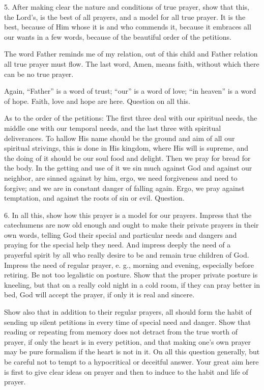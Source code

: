  5. After making clear the nature and conditions of true prayer, show that this, the Lord’s, is the best of all prayers, and a model for all true prayer. It is the best, because of Him whose it is and who
commends it, because it embraces all our wants in a few words, because of the beautiful order of the petitions.

 The word Father reminds me of my relation, out of this child and Father relation all true prayer must flow. The last word, Amen, means faith, without which there can be no true prayer.

Again, “Father” is a word of trust; “our” is a word of love; “in heaven” is a word of hope. Faith, love and hope are here. Question on all this.

 As to the order of the petitions: The first three deal with our spiritual needs, the middle one with our temporal needs, and the last three with spiritual deliverances. To hallow His name should be the ground and aim of all our spiritual strivings, this is done in His kingdom, where His will is supreme, and the doing of it should be our soul food and delight. Then we pray for bread for the body. In the getting and use of it we sin much against God and against our neighbor, are sinned against by him, ergo, we need forgiveness and need to forgive; and we are in constant danger of falling again. Ergo, we pray against temptation, and against the roots of sin or evil. Question.

6. In all this, show how this prayer is a model for our prayers. Impress that the catechumens are now old enough and ought to make their private prayers in their own words, telling God their special
 and particular needs and dangers and praying for the special help they need. And impress deeply the need of a prayerful spirit by all who really desire to be and remain true children of God. Impress the need of regular prayer, e. g., morning and evening, especially before retiring. Be not too legalistic on posture. Show that the proper private posture is kneeling, but that on a really cold night in a cold room, if they can pray better in bed, God will accept the prayer, if only it is real and sincere.

Show also that in addition to their regular prayers, all should form the habit of sending up silent petitions in every time of special need and danger. Show that reading or repeating from memory does not detract from the true worth of prayer, if only the heart is in every petition, and that making one’s own prayer may be pure formalism if the heart is not in it. On all this question generally, but be careful not to tempt to a hypocritical or deceitful answer. Your great aim here is first to give clear ideas on prayer and then to induce to the habit and life of prayer.

